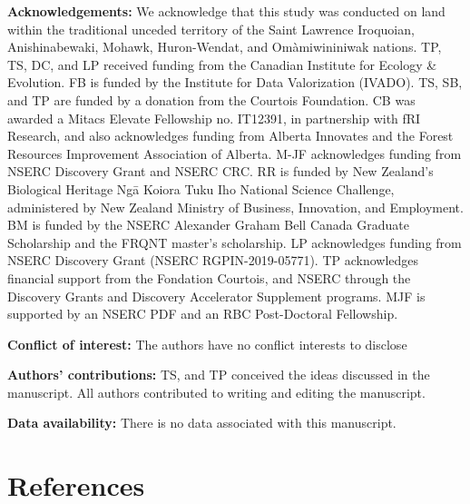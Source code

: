 \documentclass[10pt,oneside]{article}
\begin{document}
\textbf{Acknowledgements:} We acknowledge that this study was conducted
on land within the traditional unceded territory of the Saint Lawrence
Iroquoian, Anishinabewaki, Mohawk, Huron-Wendat, and Omàmiwininiwak
nations. TP, TS, DC, and LP received funding from the Canadian Institute
for Ecology \& Evolution. FB is funded by the Institute for Data
Valorization (IVADO). TS, SB, and TP are funded by a donation from the
Courtois Foundation. CB was awarded a Mitacs Elevate Fellowship no.
IT12391, in partnership with fRI Research, and also acknowledges funding
from Alberta Innovates and the Forest Resources Improvement Association
of Alberta. M-JF acknowledges funding from NSERC Discovery Grant and
NSERC CRC. RR is funded by New Zealand's Biological Heritage Ngā Koiora
Tuku Iho National Science Challenge, administered by New Zealand
Ministry of Business, Innovation, and Employment. BM is funded by the
NSERC Alexander Graham Bell Canada Graduate Scholarship and the FRQNT
master's scholarship. LP acknowledges funding from NSERC Discovery Grant
(NSERC RGPIN-2019-05771). TP acknowledges financial support from the
Fondation Courtois, and NSERC through the Discovery Grants and Discovery
Accelerator Supplement programs. MJF is supported by an NSERC PDF and an
RBC Post-Doctoral Fellowship.

\textbf{Conflict of interest:} The authors have no conflict interests to
disclose

\textbf{Authors' contributions:} TS, and TP conceived the ideas
discussed in the manuscript. All authors contributed to writing and
editing the manuscript.

\textbf{Data availability:} There is no data associated with this
manuscript.

\hypertarget{references}{%
\section*{References}\label{references}}
\end{document}
